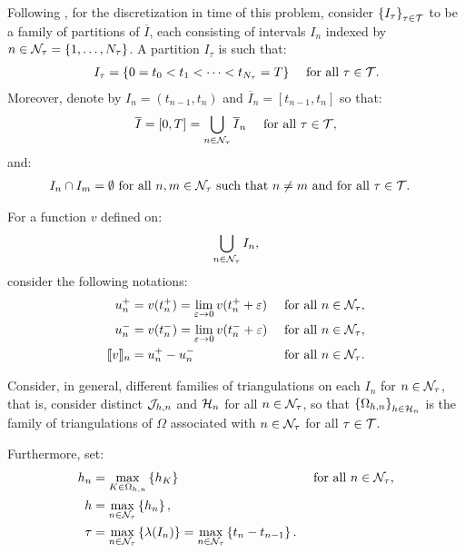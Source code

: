 Following \cite{Feistauer2007}, for the discretization in time of this problem, consider $\left\{ I_{\tau} \right\}_{\tau \in \mathcal{T}}$ to be a family of partitions of $\overline{I}$, each consisting of intervals $I_n$ indexed by $n \in \mathcal{N}_{\tau} = \left\{ 1, \dots, N_{\tau} \right\}$. A partition $I_{\tau}$ is such that:
\begin{align}
    I_{\tau} &= \left\{ 0 = t_0 < t_1 < \dots < t_{N_\tau} = T \right\} &\text{ for all } \tau \in \mathcal{T}.
\end{align}
Moreover, denote by $I_n = \left( t_{n - 1}, t_n \right)$ and $\overline{I}_n = \left[ t_{n - 1}, t_n \right]$ so that:
\begin{align}
    \overline{I} &= \left[ 0, T \right] = \bigcup_{n \in \mathcal{N}_{\tau}} \overline{I}_n &\text{ for all } \tau \in \mathcal{T},
\end{align}
and:
\begin{align}
    I_n \cap I_m = \emptyset &\text{ for all } n, m \in \mathcal{N}_{\tau} \text{ such that } n \neq m \text{ and for all } \tau \in \mathcal{T}.
\end{align}

For a function $v$ defined on:
\begin{align}
    \bigcup_{n \in \mathcal{N}_{\tau}} I_n,
\end{align}
consider the following notations:
\begin{align} %
    u_n^+ &= v(t_n^+) = \lim_{\varepsilon \rightarrow 0} v(t_n^+ + \varepsilon) &\text{ for all } n \in \TimeIndices, \\
    u_n^- &= v(t_n^-) = \lim_{\varepsilon \rightarrow 0} v(t_n^- + \varepsilon) &\text{ for all } n \in \TimeIndices, \\
    \Jump{v}_n &= u_n^+ - u_n^- &\text{ for all } n \in \TimeIndices.
\end{align}

Consider, in general, different families of triangulations on each $I_n$ for $n \in \mathcal{N}_{\tau}$, that is, consider distinct $\mathcal{J}_{h, n}$ and $\mathcal{H}_n$ for all $n \in \mathcal{N}_{\tau}$, so that $\left\{ \Omega_{h, n} \right\}_{h \in \mathcal{H}_n}$ is the family of triangulations of $\Omega$ associated with $n \in \mathcal{N}_{\tau}$ for all $\tau \in \mathcal{T}$.

Furthermore, set:
\begin{align}
    h_n &= \max_{K \in \Omega_{h, n}} \left\{ h_K \right\} &\text{ for all } n \in \mathcal{N}_{\tau}, \\
    h &= \max_{n \in \mathcal{N}_{\tau}} \left\{ h_n \right\}, \\
    \tau &= \max_{n \in \mathcal{N}_{\tau}} \left\{ \lambda(I_n) \right\} = \max_{n \in \mathcal{N}_{\tau}} \left\{ t_n - t_{n - 1} \right\}.
\end{align}

